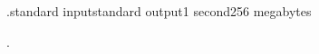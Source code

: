 \begin{problem}{.}{standard input}{standard output}{1 second}{256 megabytes}

.

\Examples

\begin{example}
%
%
\end{example}

\end{problem}


